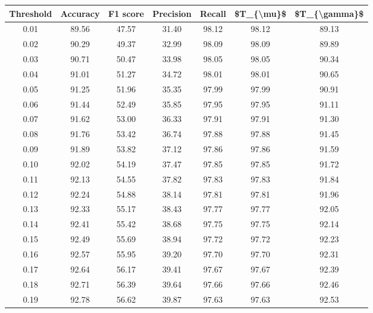 \begin{tabular}{|c|c|c|c|c|c|c|}
\hline
 Threshold &  Accuracy &  F1 score &  Precision &  Recall &  \$T\_\{\textbackslash mu\}\$ &  \$T\_\{\textbackslash gamma\}\$ \\
\hline
      0.01 &     89.56 &     47.57 &      31.40 &   98.12 &      98.12 &         89.13 \\
      0.02 &     90.29 &     49.37 &      32.99 &   98.09 &      98.09 &         89.89 \\
      0.03 &     90.71 &     50.47 &      33.98 &   98.05 &      98.05 &         90.34 \\
      0.04 &     91.01 &     51.27 &      34.72 &   98.01 &      98.01 &         90.65 \\
      0.05 &     91.25 &     51.96 &      35.35 &   97.99 &      97.99 &         90.91 \\
      0.06 &     91.44 &     52.49 &      35.85 &   97.95 &      97.95 &         91.11 \\
      0.07 &     91.62 &     53.00 &      36.33 &   97.91 &      97.91 &         91.30 \\
      0.08 &     91.76 &     53.42 &      36.74 &   97.88 &      97.88 &         91.45 \\
      0.09 &     91.89 &     53.82 &      37.12 &   97.86 &      97.86 &         91.59 \\
      0.10 &     92.02 &     54.19 &      37.47 &   97.85 &      97.85 &         91.72 \\
      0.11 &     92.13 &     54.55 &      37.82 &   97.83 &      97.83 &         91.84 \\
      0.12 &     92.24 &     54.88 &      38.14 &   97.81 &      97.81 &         91.96 \\
      0.13 &     92.33 &     55.17 &      38.43 &   97.77 &      97.77 &         92.05 \\
      0.14 &     92.41 &     55.42 &      38.68 &   97.75 &      97.75 &         92.14 \\
      0.15 &     92.49 &     55.69 &      38.94 &   97.72 &      97.72 &         92.23 \\
      0.16 &     92.57 &     55.95 &      39.20 &   97.70 &      97.70 &         92.31 \\
      0.17 &     92.64 &     56.17 &      39.41 &   97.67 &      97.67 &         92.39 \\
      0.18 &     92.71 &     56.39 &      39.64 &   97.66 &      97.66 &         92.46 \\
      0.19 &     92.78 &     56.62 &      39.87 &   97.63 &      97.63 &         92.53 \\

\end{tabular}
